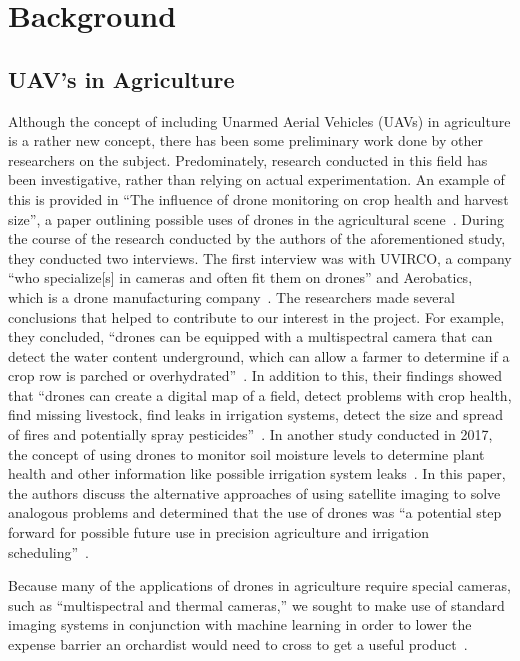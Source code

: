 \section{Background}\label{sec:background}

\subsection{UAV's in Agriculture}\label{subsec:uav's-in-agriculture}
Although the concept of including Unarmed Aerial Vehicles (UAVs) in agriculture is a
rather new concept, there has been some preliminary work done by other researchers on
the subject.
Predominately, research conducted in this field has been investigative, rather than
relying on actual experimentation.
An example of this is provided in ``The influence of drone monitoring on crop health
and harvest size'', a paper outlining possible uses of drones in the agricultural
scene~\cite{Reinecke2017}.
During the course of the research conducted by the authors of the aforementioned
study, they conducted two interviews.
The first interview was with UVIRCO, a company ``who specialize[s] in cameras and
often fit them on drones'' and Aerobatics, which is a drone manufacturing
company~\cite{Reinecke2017}.
The researchers made several conclusions that helped to contribute to our interest in
the project.
For example, they concluded, ``drones can be equipped with a multispectral camera
that can detect the water content underground, which can allow a farmer to determine
if a crop row is parched or overhydrated''~\cite{Reinecke2017}.
In addition to this, their findings showed that ``drones can create a digital map of
a field, detect problems with crop health, find missing livestock, find leaks in
irrigation systems, detect the size and spread of fires and potentially spray
pesticides''~\cite{Reinecke2017}.
In another study conducted in 2017, the concept of using drones to monitor soil
moisture levels to determine plant health and other information like possible
irrigation system leaks~\cite{Hassan2017}.
In this paper, the authors discuss the alternative approaches of using satellite
imaging to solve analogous problems and determined that the use of drones was ``a
potential step forward for possible future use in precision agriculture and
irrigation scheduling''~\cite{Hassan2017}.

Because many of the applications of drones in agriculture require special cameras,
such as ``multispectral and thermal cameras,'' we sought to make use of standard
imaging systems in conjunction with machine learning in order to lower the expense
barrier an orchardist would need to cross to get a useful product~\cite{Reinecke2017}.
